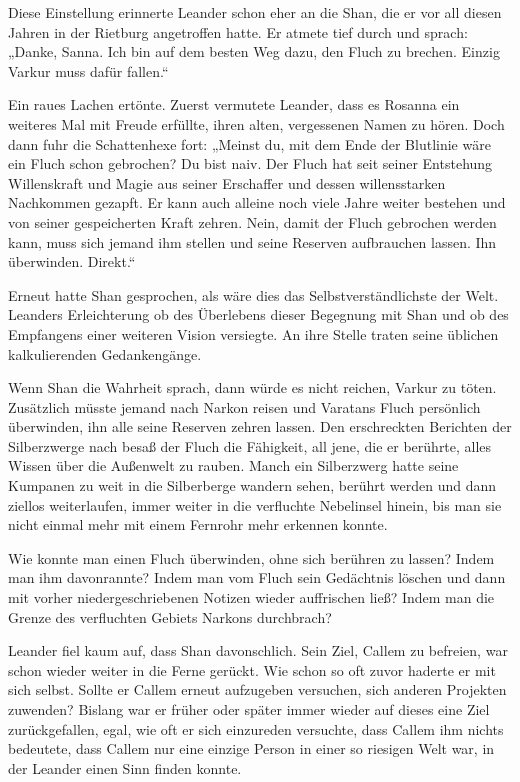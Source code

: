 \documentclass[10pt, a4paper, oneside]{book}
\begin{document}
Diese Einstellung erinnerte Leander schon eher an die Shan, die er vor all diesen Jahren in der Rietburg angetroffen hatte. Er atmete tief durch und sprach: „Danke, Sanna. Ich bin auf dem besten Weg dazu, den Fluch zu brechen. Einzig Varkur muss dafür fallen.“

Ein raues Lachen ertönte. Zuerst vermutete Leander, dass es Rosanna ein weiteres Mal mit Freude erfüllte, ihren alten, vergessenen Namen zu hören. Doch dann fuhr die Schattenhexe fort: „Meinst du, mit dem Ende der Blutlinie wäre ein Fluch schon gebrochen? Du bist naiv. Der Fluch hat seit seiner Entstehung Willenskraft und Magie aus seiner Erschaffer und dessen willensstarken Nachkommen gezapft. Er kann auch alleine noch viele Jahre weiter bestehen und von seiner gespeicherten Kraft zehren. Nein, damit der Fluch gebrochen werden kann, muss sich jemand ihm stellen und seine Reserven aufbrauchen lassen. Ihn überwinden. Direkt.“

Erneut hatte Shan gesprochen, als wäre dies das Selbstverständlichste der Welt. Leanders Erleichterung ob des Überlebens dieser Begegnung mit Shan und ob des Empfangens einer weiteren Vision versiegte. An ihre Stelle traten seine üblichen kalkulierenden Gedankengänge.

Wenn Shan die Wahrheit sprach, dann würde es nicht reichen, Varkur zu töten. Zusätzlich müsste jemand nach Narkon reisen und Varatans Fluch persönlich überwinden, ihn alle seine Reserven zehren lassen. Den erschreckten Berichten der Silberzwerge nach besaß der Fluch die Fähigkeit, all jene, die er berührte, alles Wissen über die Außenwelt zu rauben. Manch ein Silberzwerg hatte seine Kumpanen zu weit in die Silberberge wandern sehen, berührt werden und dann ziellos weiterlaufen, immer weiter in die verfluchte Nebelinsel hinein, bis man sie nicht einmal mehr mit einem Fernrohr mehr erkennen konnte.

Wie konnte man einen Fluch überwinden, ohne sich berühren zu lassen? Indem man ihm davonrannte? Indem man vom Fluch sein Gedächtnis löschen und dann mit vorher niedergeschriebenen Notizen wieder auffrischen ließ? Indem man die Grenze des verfluchten Gebiets Narkons durchbrach?

Leander fiel kaum auf, dass Shan davonschlich. Sein Ziel, Callem zu befreien, war schon wieder weiter in die Ferne gerückt. Wie schon so oft zuvor haderte er mit sich selbst. Sollte er Callem erneut aufzugeben versuchen, sich anderen Projekten zuwenden? Bislang war er früher oder später immer wieder auf dieses eine Ziel zurückgefallen, egal, wie oft er sich einzureden versuchte, dass Callem ihm nichts bedeutete, dass Callem nur eine einzige Person in einer so riesigen Welt war, in der Leander einen Sinn finden konnte.
\end{document}
